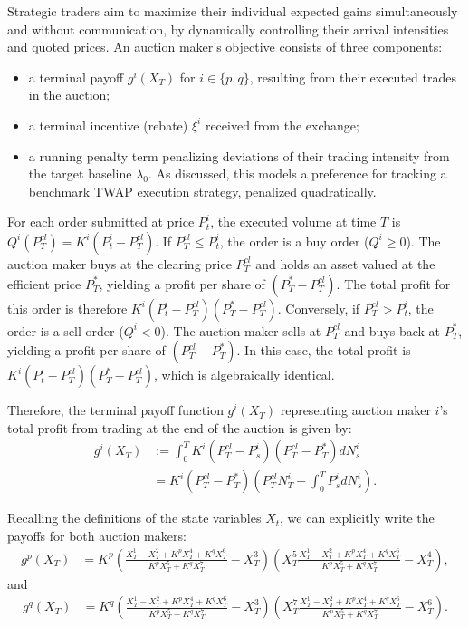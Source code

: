 \documentclass[12pt]{article}
\begin{document}
Strategic traders aim to maximize their individual expected gains simultaneously and without communication, by dynamically controlling their arrival intensities and quoted prices. An auction maker's objective consists of three components:
\begin{itemize}
\item a terminal payoff $g^i(X_T)$ for $i \in \{p,q\}$, resulting from their executed trades in the auction;
\item a terminal incentive (rebate) $\xi^i$ received from the exchange;
\item a running penalty term penalizing deviations of their trading intensity from the target baseline $\lambda_0$. As discussed, this models a preference for tracking a benchmark TWAP execution strategy, penalized quadratically.
\end{itemize}

For each order submitted at price $P^i_t$, the executed volume at time $T$ is $Q^i(P^{cl}_T) = K^i(P^i_t - P^{cl}_T)$. If $P^{cl}_T \leq P^i_t$, the order is a buy order ($Q^i \geq 0$). The auction maker buys at the clearing price $P^{cl}_T$ and holds an asset valued at the efficient price $P^*_T$, yielding a profit per share of $(P^*_T - P^{cl}_T)$. The total profit for this order is therefore $K^i(P^i_t - P^{cl}_T)(P^*_T - P^{cl}_T)$. Conversely, if $P^{cl}_T > P^i_t$, the order is a sell order ($Q^i < 0$). The auction maker sells at $P^{cl}_T$ and buys back at $P^*_T$, yielding a profit per share of $(P^{cl}_T - P^*_T)$. In this case, the total profit is $K^i(P^i_t - P^{cl}_T)(P^*_T - P^{cl}_T)$, which is algebraically identical.

Therefore, the terminal payoff function $g^i(X_T)$ representing auction maker $i$'s total profit from trading at the end of the auction is given by:
\begin{align*}
    g^i(X_T) &:= \int_0^T K^i(P^{cl}_T - P^i_{s})(P^{cl}_T - P^{*}_T)dN^i_s \\
    &= K^i(P^{cl}_T - P^{*}_T)\left(P^{cl}_T N^i_T - \int_0^T P^i_{s}dN^i_s\right).
\end{align*}

Recalling the definitions of the state variables $X_t$, we can explicitly write the payoffs for both auction makers:
\begin{align*}
    g^p(X_T) &= K^p \left(\frac{X_T^1 - X_T^2 + K^pX_T^4 + K^{q}X_T^6}{K^pX_T^5+K^{q}X_T^7} - X_T^3\right)\left(X_T^5\frac{X_T^1 - X_T^2 + K^pX_T^4 + K^{q}X_T^6}{K^pX_T^5+K^{q}X_T^7} - X_T^4\right),
\end{align*}
and
\begin{align*}
    g^q(X_T) &= K^q \left(\frac{X_T^1 - X_T^2 + K^pX_T^4 + K^{q}X_T^6}{K^pX_T^5+K^{q}X_T^7} - X_T^3\right)  \left(X_T^7\frac{X_T^1 - X_T^2 + K^pX_T^4 + K^{q}X_T^6}{K^pX_T^5+K^{q}X_T^7} - X_T^6\right).
\end{align*}
\end{document}
